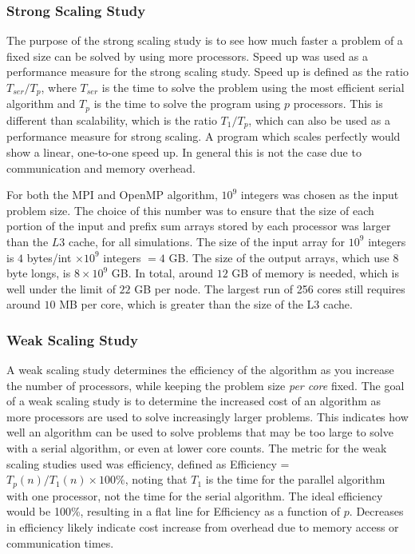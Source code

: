 \documentclass[12pt]{article}
\begin{document}
{{{\subsubsection{Strong Scaling Study} 

The purpose of the strong scaling
study is to see how much faster a problem of a fixed size can be solved by
using more processors.  Speed up was used as a performance measure for the strong
scaling study.   Speed up is defined as the ratio $T_{ser}/T_p$, where $T_{ser}$ is the time to solve the problem using the most
efficient serial algorithm and $T_{p}$ is the time to solve the program using $p$
processors. This is different than scalability,
which is the ratio $T_{1}/T_{p}$, which can also be used as a performance measure for
strong scaling.  A program which scales perfectly would show a linear, one-to-one
speed up.  In general this is not the case due to communication and memory overhead.

For both the MPI and OpenMP algorithm, $10^9$ integers was chosen as the input
problem size. The choice of this number was to ensure that the size of each portion of
the input and prefix sum arrays stored by each processor was larger than the $L3$
cache, for all simulations.  The size of the input array for $10^9$ integers is $4$ bytes/int
$\times 10^9$ integers $=4$ GB.  The size of the output arrays, which use 8 byte
longs, is $8\times 10^9$ GB. In total, around $12$ GB of memory is needed, which is well
under the limit of $22$ GB per node.  The largest run of 256 cores still requires
around $10$ MB per core, which is greater than the size of the L3 cache.


\subsubsection{Weak Scaling Study}

A weak scaling study determines the efficiency of the algorithm as you increase the
number of processors, while keeping the problem size \emph{per core} fixed.
The goal of a weak scaling study is to determine the increased cost of an algorithm
as more processors are used to solve increasingly larger problems. This indicates how
well an algorithm can be used to solve problems that may be too large to solve with a
serial algorithm, or even at lower core counts.  The metric for the weak scaling studies used was efficiency,
defined as Efficiency = $T_p(n)/T_1(n)\times 100\%$, noting that $T_1$ is the time for the parallel
algorithm with one processor, not the time for the serial algorithm.  The ideal
efficiency would be 100\%, resulting in a flat line for Efficiency as a function of
$p$.  Decreases in efficiency likely indicate cost increase from overhead due to memory access or
communication times.

}}}
\end{document}
